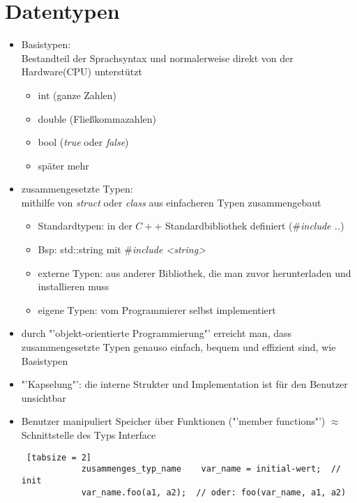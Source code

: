\documentclass{article}
\begin{document}
	\section{Datentypen}
	\begin{itemize}
		\item Basistypen:  \\
		Bestandteil der Sprachsyntax und normalerweise direkt von der Hardware(CPU) unterstützt
		\begin{itemize}
			\item int (ganze Zahlen)
			\item double (Fließkommazahlen)
			\item bool (\textit{true} oder \textit{false})
			\item später mehr
		\end{itemize}
		\item zusammengesetzte Typen: \\
		mithilfe von \textit{struct} oder \textit{class} aus einfacheren Typen zusammengebaut
		\begin{itemize}
			\item Standardtypen: in der $C++$ Standardbibliothek definiert (\#\textit{include ..})
			\item Bsp: std::string mit \#\textit{include <string>}
			\item externe Typen: aus anderer Bibliothek, die man zuvor herunterladen und installieren muss
			\item eigene Typen: vom Programmierer selbst implementiert
		\end{itemize}
		\item durch "'objekt-orientierte Programmierung"' erreicht man, dass zusammengesetzte Typen genauso einfach, bequem und effizient sind, wie Basistypen
		\item "'Kapselung"': die interne Strukter und Implementation ist für den Benutzer unsichtbar
		\item Benutzer manipuliert Speicher über Funktionen ("'member functions"') $\approx$ Schnittstelle des Typs Interface \\
		\begin{lstlisting} [tabsize = 2]
			zusammenges_typ_name    var_name = initial-wert;  // init
			var_name.foo(a1, a2);  // oder: foo(var_name, a1, a2)
		\end{lstlisting}
	\end{itemize}
	
\end{document}
